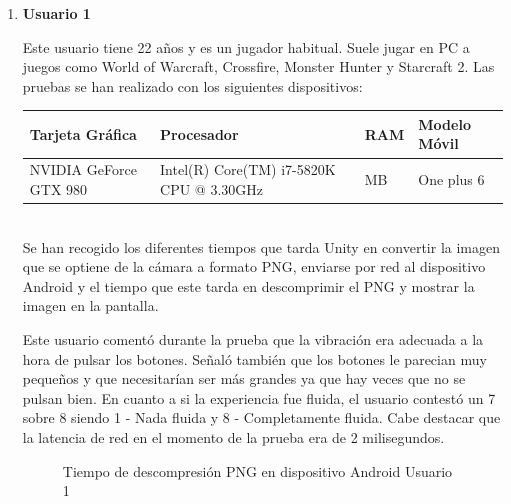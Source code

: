 \begin{enumerate}
  \item \textbf{Usuario 1}

Este usuario tiene 22 a\~nos y es un jugador habitual. Suele jugar en PC a juegos como World of Warcraft, Crossfire, Monster Hunter y Starcraft 2.
Las pruebas se han realizado con los siguientes dispositivos: \\

\begin{tabularx}{1.0\textwidth} { 
  | >{\centering\arraybackslash}X 
  | >{\centering\arraybackslash}X 
  | >{\centering\arraybackslash}X 
  | >{\centering\arraybackslash}X | }
 \hline
 \textbf{Tarjeta Gr\'afica} & \textbf{Procesador} & \textbf{RAM} & \textbf{Modelo M\'ovil} \\
 \hline
 NVIDIA GeForce GTX 980  & Intel(R) Core(TM) i7-5820K CPU @ 3.30GHz  & 32594 MB & One plus 6  \\
\hline
\end{tabularx}
\\
Se han recogido los diferentes tiempos que tarda Unity en convertir la imagen que se optiene de la c\'amara a formato PNG, enviarse por red al dispositivo Android y el tiempo que este tarda en descomprimir el PNG y mostrar la imagen en la pantalla. 

Este usuario coment\'o durante la prueba que la vibraci\'on era adecuada a la hora de pulsar los botones. Se\~nal\'o tambi\'en que los botones le parecian muy peque\~nos y que necesitar\'ian ser m\'as grandes ya que hay veces que no se pulsan bien. En cuanto a si la experiencia fue fluida, el usuario contest\'o un 7 sobre 8 siendo 1 - Nada fluida y 8 - Completamente fluida. Cabe destacar que la latencia de red en el momento de la prueba era de 2 milisegundos.

\begin{figure}[!h]
\centering
{}%
\caption{Tiempo de descompresi\'on PNG en dispositivo Android Usuario 1}
\end{figure}


\end{enumerate}
